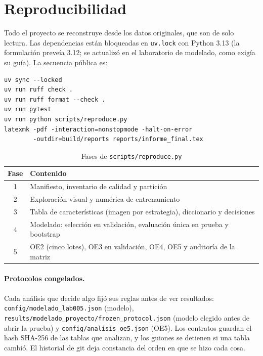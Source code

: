 ﻿\section{Reproducibilidad}

Todo el proyecto se reconstruye desde los datos originales, que son de solo
lectura. Las dependencias están bloqueadas en \texttt{uv.lock} con Python 3.13
(la formulación preveía 3.12; se actualizó en el laboratorio de modelado, como
exigía su guía). La secuencia pública es:

\begin{verbatim}
uv sync --locked
uv run ruff check .
uv run ruff format --check .
uv run pytest
uv run python scripts/reproduce.py
latexmk -pdf -interaction=nonstopmode -halt-on-error
        -outdir=build/reports reports/informe_final.tex
\end{verbatim}

\begin{table}[H]
\centering
\small
\caption{Fases de \texttt{scripts/reproduce.py}}
\begin{tabular}{@{}cp{11.8cm}@{}}
\toprule
\textbf{Fase} & \textbf{Contenido} \\
\midrule
1 & Manifiesto, inventario de calidad y partición \\
2 & Exploración visual y numérica de entrenamiento \\
3 & Tabla de características (imagen por estrategia), diccionario y decisiones \\
4 & Modelado: selección en validación, evaluación única en prueba y bootstrap \\
5 & OE2 (cinco lotes), OE3 en validación, OE4, OE5 y auditoría de la matriz \\
\bottomrule
\end{tabular}
\end{table}

\paragraph{Protocolos congelados.} Cada análisis que decide algo fijó sus reglas
antes de ver resultados: \texttt{config/modelado\_lab005.json} (modelo),
\texttt{results/modelado\_proyecto/frozen\_protocol.json} (modelo elegido antes de
abrir la prueba) y \texttt{config/analisis\_oe5.json} (OE5). Los contratos guardan
el hash SHA-256 de las tablas que analizan, y los guiones se detienen si una tabla
cambió. El historial de git deja constancia del orden en que se hizo cada cosa.

